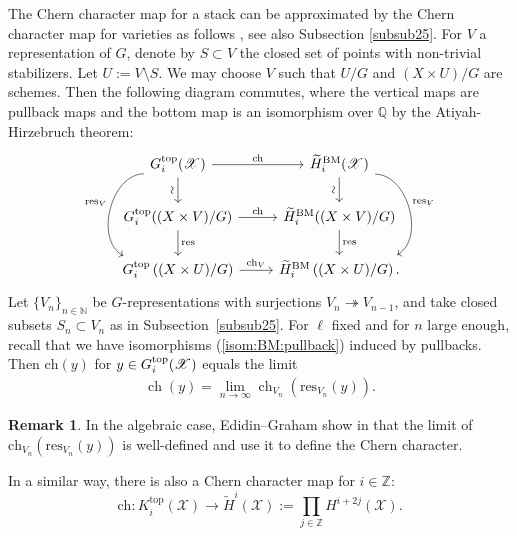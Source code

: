\documentclass [11pt,oneside,a4paper,mathscr]{amsart}
\theoremstyle{definition}
\newtheorem{remark}[thm]{Remark}
\newcommand{\X}{\mathscr{X}}
\newcommand{\ch}{\operatorname{ch}}
\begin{document}
The Chern character map for a stack can be approximated by the Chern character map for varieties as follows \cite{EdidinGraham}, see also Subsection \ref{subsub25}.
For $V$ a representation of $G$, denote by $S\subset V$ the closed set of points with non-trivial stabilizers. Let $U:=V\setminus S$. We may choose $V$ such that $U/G$ and $(X\times U)/G$ are schemes.
Then the following diagram commutes, where the vertical maps are pullback maps and the bottom map is an isomorphism
over $\mathbb{Q}$ by the Atiyah-Hirzebruch theorem:
\begin{equation*}
    \begin{tikzcd}
        G^{\mathrm{top}}_i(\mathscr{X})\arrow[r, "\mathrm{ch}"]\arrow[d, "\sim" {anchor=south, rotate=90}]\arrow[dd,bend right=75, "\mathrm{res}_V"']& \widetilde{H}^{\mathrm{BM}}_i(\mathscr{X})\arrow[d, "\sim" {anchor=south, rotate=90}]\arrow[dd,bend left=75, "\mathrm{res}_V"]\\
        G^{\mathrm{top}}_i((X\times V)/G)\arrow[r, "\mathrm{ch}"]\arrow[d, "\mathrm{res}"]& \widetilde{H}^{\mathrm{BM}}_i((X\times V)/G)\arrow[d, "\mathrm{res}"]\\
        G^{\mathrm{top}}_i\left((X\times U)/G\right)\arrow[r, "\mathrm{ch}_V"]& \widetilde{H}^{\mathrm{BM}}_i\left((X\times U)/G\right).
    \end{tikzcd}
\end{equation*}
Let $\{V_n\}_{n\in \mathbb{N}}$ 
be $G$-representations 
with surjections $V_n\twoheadrightarrow V_{n-1}$, 
and take closed subsets $S_n \subset V_n$ as in Subsection~\ref{subsub25}.
For $\ell$ fixed and for $n$ large enough, recall that 
we have isomorphisms (\ref{isom:BM:pullback}) induced by pullbacks. 
Then $\mathrm{ch}(y)$ 
for $y \in G_i^{\rm{top}}(\X)$
equals the limit 
\begin{align}\label{equal:limit}
    \ch(y)=\lim_{n\to \infty} \ch_{V_n}(\mathrm{res}_{V_n}(y)).
\end{align}
\begin{remark}
    In the algebraic case, Edidin--Graham show in \cite[Proposition 3.1]{EdidinGraham} that the limit of $\mathrm{ch}_{V_n}(\mathrm{res}_{V_n}(y))$ is well-defined and use it to define the Chern character. 
\end{remark}
In a similar way, there is also a Chern character map for $i\in\mathbb{Z}$:
\begin{equation}\label{chernstack2}
\mathrm{ch}\colon K^{\mathrm{top}}_i(\mathscr{X})\to \widetilde{H}^{i}(\mathscr{X}):=\prod_{j\in\mathbb{Z}}H^{i+2j}(\mathscr{X}).
\end{equation} 
\end{document}
